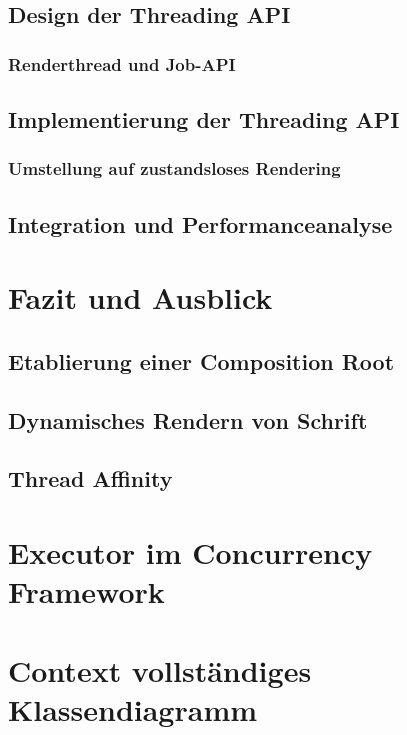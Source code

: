 \documentclass[12pt,a4paper,listof=totocnumbered,parskip=half]{scrreprt}
\begin{document}
\section{Design der Threading API}

\subsection{Renderthread und Job-API}


\section{Implementierung der Threading API}


\subsection{Umstellung auf zustandsloses Rendering}

\section{Integration und Performanceanalyse}

\chapter{Fazit und Ausblick}
\section{Etablierung einer Composition Root}

\section{Dynamisches Rendern von Schrift}
\section{Thread Affinity}
\printnoidxglossaries

\printbibliography[title={Literaturverzeichnis},heading=bibintoc,notkeyword=online]

\printbibliography[title={Quellenverzeichnis},heading=bibintoc,keyword=online] 

\appendix
\clearpage
{}
\setcounter{page}{1}

\chapter{Executor im Concurrency Framework}\label{appendix:concFrameworkExecutor}


\chapter{Context vollständiges Klassendiagramm}\label{appendix:context}
{
	\centering
	
}
\end{document}
